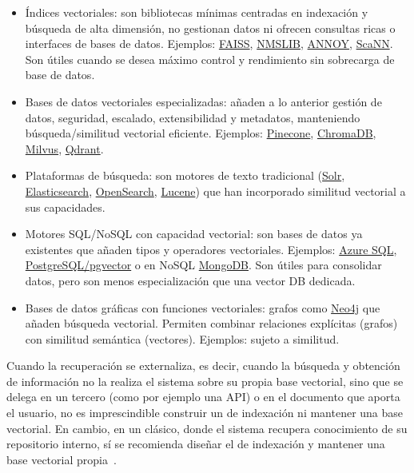 \begin{itemize}
	\begin{itemize}
		\item Índices vectoriales: son bibliotecas mínimas centradas en indexación y búsqueda de alta dimensión, no gestionan datos ni ofrecen consultas ricas o interfaces de bases de datos. Ejemplos: \href{https://faiss.ai/index.html}{FAISS}, \href{https://nmslib.github.io/nmslib/}{NMSLIB}, \href{https://github.com/spotify/annoy}{ANNOY}, \href{https://milvus.io/docs/es/scann.md}{ScaNN}. Son útiles cuando se desea máximo control y rendimiento sin sobrecarga de base de datos.
		\item Bases de datos vectoriales especializadas: añaden a lo anterior gestión de datos, seguridad, escalado, extensibilidad y metadatos, manteniendo búsqueda/similitud vectorial eficiente. Ejemplos: \href{https://www.pinecone.io/}{Pinecone}, \href{https://www.trychroma.com/}{ChromaDB}, \href{https://milvus.io/es}{Milvus}, \href{https://qdrant.tech/}{Qdrant}.
		\item Plataformas de búsqueda: son motores de texto tradicional (\href{https://solr.apache.org/}{Solr}, \href{https://www.elastic.co/es/enterprise-search/vector-search}{Elasticsearch}, \href{https://opensearch.org/platform/vector-search/}{OpenSearch}, \href{https://lucene.apache.org/core/}{Lucene}) que han incorporado similitud vectorial a sus capacidades.
		\item Motores SQL/NoSQL con capacidad vectorial: son bases de datos ya existentes que añaden tipos y operadores vectoriales. Ejemplos: \href{https://azure.microsoft.com/es-es/products/azure-sql/database}{Azure SQL}, \href{https://www.postgresql.org/about/news/pgvector-070-released-2852/}{PostgreSQL/pgvector} o en NoSQL \href{https://www.mongodb.com/}{MongoDB}. Son útiles para consolidar datos, pero son menos especialización que una vector DB dedicada.
		\item Bases de datos gráficas con funciones vectoriales: grafos como \href{https://neo4j.com/}{Neo4j} que añaden búsqueda vectorial. Permiten combinar relaciones explícitas (grafos) con similitud semántica (vectores). Ejemplos:  sujeto a similitud.
	\end{itemize}
\end{itemize} 

Cuando la recuperación se externaliza, es decir, cuando la búsqueda y obtención de información no la realiza el sistema sobre su propia base vectorial, sino que se delega en un tercero (como por ejemplo una API) o en el documento que aporta el usuario, no es imprescindible construir un  de indexación ni mantener una base vectorial. En cambio, en un  clásico, donde el sistema recupera conocimiento de su repositorio interno, sí se recomienda diseñar el  de indexación y mantener una base vectorial propia~\cite{book:RAG_SimpleGuide}.

